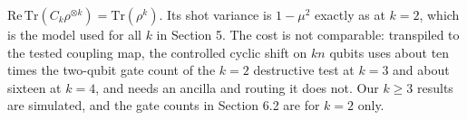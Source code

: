 %
%

\(\mathrm{Re}\,\mathrm{Tr}(C_k \rho^{\otimes k}) = \mathrm{Tr}(\rho^k)\).
Its shot variance is \(1 - \mu^2\) exactly as at \(k = 2\), which is the
model used for all \(k\) in Section 5. The cost is not comparable:
transpiled to the tested coupling map, the controlled cyclic shift on
\(kn\) qubits uses about ten times the two-qubit gate count of the
\(k = 2\) destructive test at \(k = 3\) and about sixteen at \(k = 4\),
and needs an ancilla and routing it does not. Our \(k \geq 3\) results are
simulated, and the gate counts in Section 6.2 are for \(k = 2\) only.
